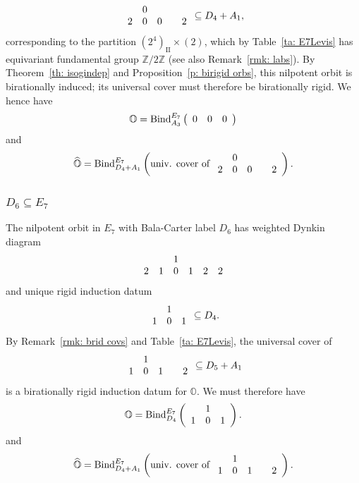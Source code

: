 \documentclass[11pt]{amsart}
\renewcommand{\O}{{\mathbb O}}
\newcommand{\bZ}{{\mathbb Z}}
\newcommand{\II}{{\operatorname{II}}}
\newcommand{\BInd}{{{\mbox{\rm Bind}}}}
\newcommand{\hatO}{\widehat{\O}}
\numberwithin{equation}{section}
\begin{document}
	$$\begin{array}{c c c c c}
		& 0 & & & \\
		2 & 0 & 0 & & 2\\
	\end{array}\subseteq D_4+A_1,$$ corresponding to the partition $(2^4)_\II\times (2)$, which by Table~\ref{ta: E7Levis} has equivariant fundamental group $\bZ/2\bZ$ (see also Remark~\ref{rmk: labs}). By Theorem~\ref{th: isogindep} and Proposition~\ref{p: birigid orbs}, this nilpotent orbit is birationally induced; its universal cover must therefore be birationally rigid. We hence have $$\O=\BInd_{A_3}^{E_7}\left( \begin{array}{c c c}
		0 & 0 & 0\\
	\end{array} \right)$$ and $$\hatO=\BInd_{D_4+ A_1}^{E_7}\left(\mbox{univ. cover of }\begin{array}{c c c c c c}
		& 0 & & & \\
		2 & 0 & 0 & & 2\\
	\end{array}\right).$$
	\fi
	

	\subsubsection{\texorpdfstring{$D_6\subseteq E_7$}{D6 in E7}}\label{sss: D6 in E7}
	
	The nilpotent orbit in $E_7$ with Bala-Carter label $D_6$ has weighted Dynkin diagram $$\begin{array}{c c c c c c}
		& & 1 & & & \\
		2 & 1 & 0 & 1 & 2 & 2 \\
	\end{array}$$ and unique rigid induction datum
	$$\begin{array}{c c c}
		& 1 & \\
		1 & 0 & 1\\
	\end{array}\subseteq D_4.$$ 
	By Remark~\ref{rmk: brid covs} and Table~\ref{ta: E7Levis}, the universal cover of $$\begin{array}{c c c c c}
		& 1 & & & \\
		 1 & 0 & 1 & & 2 \\
	\end{array}\subseteq D_5+A_1$$ is a birationally rigid induction datum for $\O$. We must therefore have
	$$\O = \BInd_{D_4}^{E_7}\left( \begin{array}{c c c}
		& 1 & \\
		1 & 0 & 1\\
	\end{array}\right).$$
	and
	$$\hatO = \BInd_{D_4+ A_1}^{E_7}\left( \mbox{univ. cover of }\begin{array}{c c c c c}
		 & 1 & & & \\
		 1 & 0 & 1 & & 2 \\
	\end{array} \right).$$
	
\end{document}
